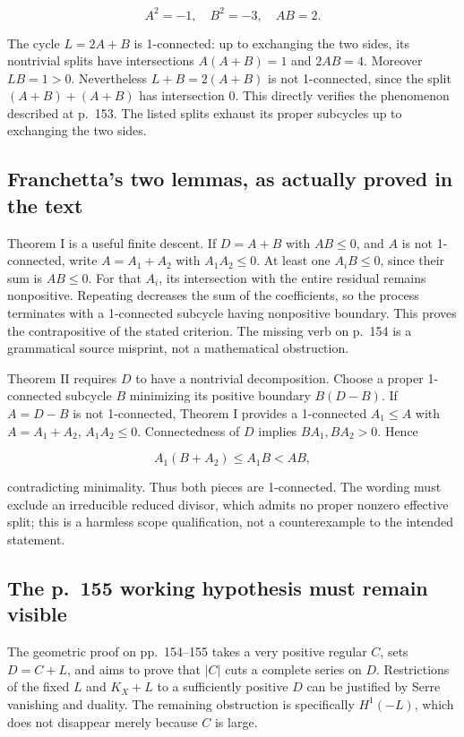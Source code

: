 \[
A^2=-1,\quad B^2=-3,\quad AB=2.
\]

The cycle \(L=2A+B\) is 1-connected: up to exchanging the two sides, its nontrivial splits have intersections \(A(A+B)=1\) and \(2AB=4\). Moreover \(LB=1>0\). Nevertheless \(L+B=2(A+B)\) is not 1-connected, since the split \((A+B)+(A+B)\) has intersection 0. This directly verifies the phenomenon described at p.~153. The listed splits exhaust its proper subcycles up to exchanging the two sides.

\subsection{Franchetta's two lemmas, as actually proved in the text}

Theorem I is a useful finite descent. If \(D=A+B\) with \(AB\le0\), and \(A\) is not 1-connected, write \(A=A_1+A_2\) with \(A_1A_2\le0\). At least one \(A_iB\le0\), since their sum is \(AB\le0\). For that \(A_i\), its intersection with the entire residual remains nonpositive. Repeating decreases the sum of the coefficients, so the process terminates with a 1-connected subcycle having nonpositive boundary. This proves the contrapositive of the stated criterion. The missing verb on p.~154 is a grammatical source misprint, not a mathematical obstruction.

Theorem II requires \(D\) to have a nontrivial decomposition. Choose a proper 1-connected subcycle \(B\) minimizing its positive boundary \(B(D-B)\). If \(A=D-B\) is not 1-connected, Theorem I provides a 1-connected \(A_1\le A\) with \(A=A_1+A_2\), \(A_1A_2\le0\). Connectedness of \(D\) implies \(BA_1,BA_2>0\). Hence

\[
A_1(B+A_2)\le A_1B<AB,
\]

contradicting minimality. Thus both pieces are 1-connected. The wording must exclude an irreducible reduced divisor, which admits no proper nonzero effective split; this is a harmless scope qualification, not a counterexample to the intended statement.

\subsection{The p.~155 working hypothesis must remain visible}

The geometric proof on pp.~154--155 takes a very positive regular \(C\), sets \(D=C+L\), and aims to prove that \(|C|\) cuts a complete series on \(D\). Restrictions of the fixed \(L\) and \(K_X+L\) to a sufficiently positive \(D\) can be justified by Serre vanishing and duality. The remaining obstruction is specifically \(H^1(-L)\), which does not disappear merely because \(C\) is large.

